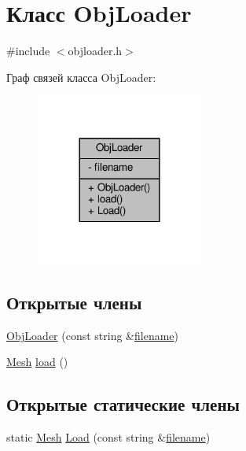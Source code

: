 \hypertarget{class_obj_loader}{}\section{Класс Obj\+Loader}
\label{class_obj_loader}


{\ttfamily \#include $<$objloader.\+h$>$}



Граф связей класса Obj\+Loader\+:
\nopagebreak
\begin{figure}[H]
\begin{center}
\leavevmode
\includegraphics[width=156pt]{df/dcd/class_obj_loader__coll__graph}
\end{center}
\end{figure}
\subsection*{Открытые члены}
\begin{DoxyCompactItemize}
\item 
\hyperlink{class_obj_loader_a3371efa56723975460455dd7ff14882b}{Obj\+Loader} (const string \&\hyperlink{class_obj_loader_a19f5e9808f15ad018f6ca66fa047b15c}{filename})
\item 
\hyperlink{class_mesh}{Mesh} \hyperlink{class_obj_loader_a8d4e47e1e5c9cf9b96401037f818ae95}{load} ()
\end{DoxyCompactItemize}
\subsection*{Открытые статические члены}
\begin{DoxyCompactItemize}
\item 
static \hyperlink{class_mesh}{Mesh} \hyperlink{class_obj_loader_abe0da9b7f93b7fe357b52b70244d3519}{Load} (const string \&\hyperlink{class_obj_loader_a19f5e9808f15ad018f6ca66fa047b15c}{filename})
\end{DoxyCompactItemize}
